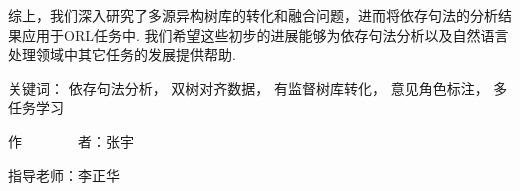 \begin{cabstract}
\begin{enumerate}
    \end{enumerate}

    综上，我们深入研究了多源异构树库的转化和融合问题，进而将依存句法的分析结果应用于ORL任务中. 我们希望这些初步的进展能够为依存句法分析以及自然语言处理领域中其它任务的发展提供帮助.

    \vskip 21bp
        {\heiti{} 关键词：}
    依存句法分析，
    双树对齐数据，
    有监督树库转化，
    意见角色标注，
    多任务学习

    \begin{flushright}
        作~~~~~~~~者：张宇

        指导老师：李正华

    \end{flushright}


\end{cabstract}


